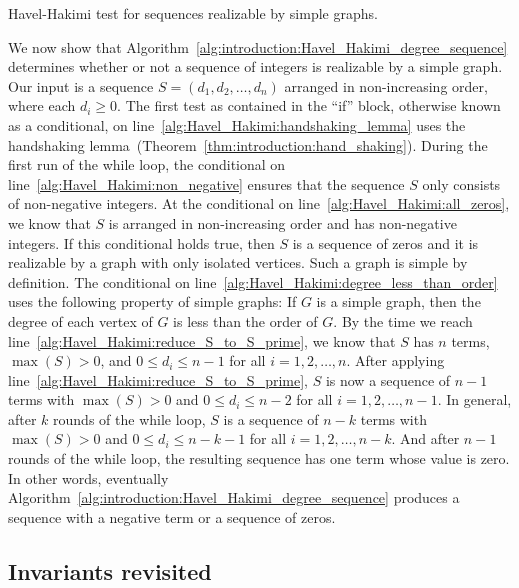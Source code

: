 \begin{algorithm}[!htpb]

\caption{Havel-Hakimi test for sequences realizable by simple graphs.}
\label{alg:introduction:Havel_Hakimi_degree_sequence}
\end{algorithm}

We now show that
Algorithm~\ref{alg:introduction:Havel_Hakimi_degree_sequence}
determines whether or not a sequence of integers is realizable by a
simple graph. Our input is a sequence $S = (d_1, d_2, \dots, d_n)$
arranged in non-increasing order, where each $d_i \geq 0$. The first
test as contained in the ``if'' block, otherwise known as a
conditional, on line~\ref{alg:Havel_Hakimi:handshaking_lemma} uses the
handshaking
lemma~(Theorem~\ref{thm:introduction:hand_shaking}). During the first
run of the while loop, the conditional on
line~\ref{alg:Havel_Hakimi:non_negative} ensures that the sequence $S$
only consists of non-negative integers. At the conditional on
line~\ref{alg:Havel_Hakimi:all_zeros}, we know that $S$ is arranged in
non-increasing order and has non-negative integers. If this
conditional holds true, then $S$ is a sequence of zeros and it is
realizable by a graph with only isolated vertices. Such a graph is
simple by definition. The conditional on
line~\ref{alg:Havel_Hakimi:degree_less_than_order} uses the following
property of simple graphs: If $G$ is a simple graph, then the degree
of each vertex of $G$ is less than the order of $G$. By the time we
reach line~\ref{alg:Havel_Hakimi:reduce_S_to_S_prime}, we know that
$S$ has $n$ terms, $\max(S) > 0$, and $0 \leq d_i \leq n - 1$ for all
$i = 1, 2, \dots, n$. After applying
line~\ref{alg:Havel_Hakimi:reduce_S_to_S_prime}, $S$ is now a sequence
of $n - 1$ terms with $\max(S) > 0$ and $0 \leq d_i \leq n - 2$ for all
$i = 1, 2, \dots, n-1$. In general, after $k$ rounds of the while
loop, $S$ is a sequence of $n - k$ terms with $\max(S) > 0$ and
$0 \leq d_i \leq n - k - 1$ for all $i = 1, 2, \dots, n-k$. And after
$n - 1$ rounds of the while loop, the resulting sequence has one term
whose value is zero. In other words, eventually
Algorithm~\ref{alg:introduction:Havel_Hakimi_degree_sequence} produces
a sequence with a negative term or a sequence of zeros.



\subsection{Invariants revisited}

